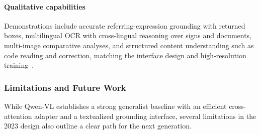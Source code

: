 \begin{enrichment}
\begin{enrichment}
        \paragraph{Qualitative capabilities}
        Demonstrations include accurate referring\mbox{-}expression grounding with returned boxes, multilingual OCR with cross\mbox{-}lingual reasoning over signs and documents, multi\mbox{-}image comparative analyses, and structured content understanding such as code reading and correction, matching the interface design and high\mbox{-}resolution training~\cite{bai2023_qwenvl}.
        
        \subsubsection{Limitations and Future Work}
        \label{subsubsec:chapter24_qwenvl_limits}
        
        While Qwen\mbox{-}VL establishes a strong generalist baseline with an efficient cross\mbox{-}attention adapter and a textualized grounding interface, several limitations in the 2023 design also outline a clear path for the next generation.
        

\end{enrichment}
\end{enrichment}
